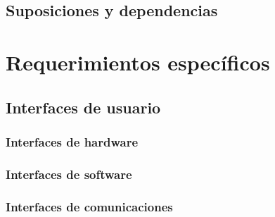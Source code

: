 \documentclass[paper=letter,oneside,fontsize=12pt, parskip=full]{scrartcl}
\begin{document}
	\subsection{Suposiciones y dependencias}	
	
	\section{Requerimientos específicos}
	
	\subsection{Interfaces de usuario}
	
	\subsubsection{Interfaces de hardware}
	
	\subsubsection{Interfaces de software}
	
	\subsubsection{Interfaces de comunicaciones}
	
		\newcommand{\funcreq}[7]{
			\subsubsection{Requerimiento funcional {#1}}

			\begin{table}[H]			
				\begin{tabularx}{\textwidth}{rX}			
					\textbf{ID:} 	&	{#2}		\\
					Titulo:			&  	{#3}. 		\\
					Descripción:	&	{#4}.		\\
					Justificación: 	&	{#5}.		\\
					Dependencias:	& 	{#6}.		\\
					Usuario:		&	{#7}.		\\
				\end{tabularx}				
			\end{table}
		}
		
\end{document}
